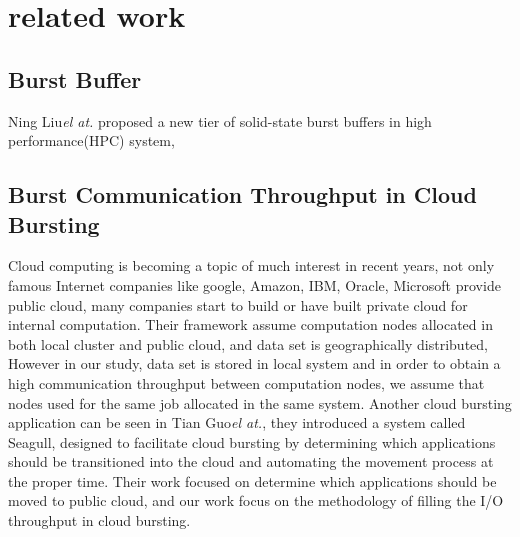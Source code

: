 \section{related work}
\label{sec:related work}

\subsection{Burst Buffer}
Ning Liu\emph{el at.} \cite{on_the_role_of_burst_buffers} proposed a new tier of solid-state burst
buffers in high performance(HPC) system, 

\subsection{Burst Communication Throughput in Cloud Bursting}
Cloud computing is becoming a topic of much interest in recent years, not only famous Internet
companies like google, Amazon, IBM, Oracle, Microsoft provide public cloud, many companies start to
build or have built private cloud for internal computation.
Their framework assume computation nodes allocated in both local cluster and public cloud, and data
set is geographically distributed, However in our study, data set is stored in local system and in
order to obtain a high communication throughput between computation nodes, we assume that nodes
used for the same job allocated in the same system.
Another cloud bursting application can be seen in Tian Guo\emph{el at.}\cite{Seagull}, they
introduced a system called Seagull, designed to facilitate cloud bursting by determining which
applications should be transitioned into the cloud and automating the movement process at the proper
time. Their work focused on determine which applications should be moved to public cloud, and our
work focus on the methodology of filling the I/O throughput in cloud bursting.